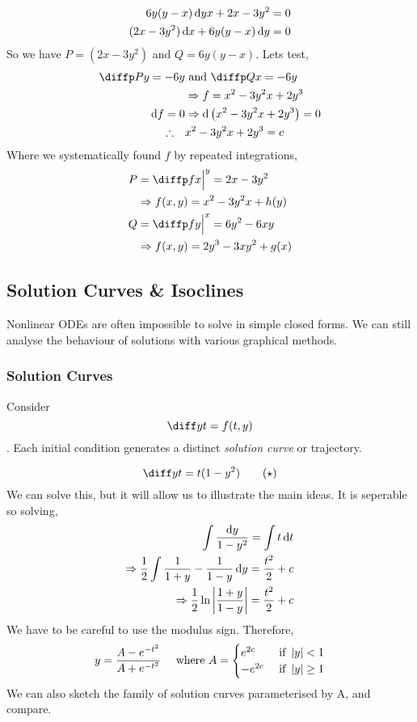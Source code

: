 \documentclass{article}
\begin{document}
\begin{eg}
    \begin{align*}
        6y(y - x) \mathop{}\!\mathrm{d} yx + 2x - 3y^2 = 0 \\
        (2x - 3y^2) \mathop{}\!\mathrm{d} x + 6y(y-x) \mathop{}\!\mathrm{d} y = 0
    \end{align*}
    So we have $P = (2x - 3y^2)$ and $Q = 6y(y-x)$. Lets test,
    \begin{align*}
        \diffp Py = -6y &\text{ and } \diffp Qx = -6y \\
        &\Rightarrow f = x^2 - 3y^2x + 2y^3 \\
        \diffd f = 0 &\Rightarrow \diffd \bkt{x^2 - 3y^2x + 2y^3} = 0 \\
        \therefore \quad & x^2 - 3y^2x + 2y^3 = c
    \end{align*}
    Where we systematically found $f$ by repeated integrations,
    \begin{align*}
        P &= \diffp fx \eval{}{y} = 2x - 3y^2 \\
        &\Rightarrow f(x, y) = x^2 - 3y^2x + h(y) \\
        Q &= \diffp fy \eval{}{x} = 6y^2 - 6xy \\
        &\Rightarrow f(x, y) = 2y^3 - 3xy^2 + g(x)
    \end{align*}
\end{eg}

\subsection{Solution Curves \& Isoclines}
Nonlinear ODEs are often impossible to solve in simple closed forms. 
We can still analyse the behaviour of solutions with various graphical methods. 

\subsubsection{Solution Curves}
Consider 
\[
    \diff yt = f(t, y)
\]. 
Each initial condition generates a distinct \emph{solution curve} or trajectory.
\begin{eg}
    \[
        \diff yt = t(1 - y^2) \tag{$\star$}
    \]
    We can solve this, but it will allow us to illustrate the main ideas.
    It is seperable so solving,
    \begin{align*}
        \int{\frac{\mathop{}\!\mathrm{d}y}{1 - y^2}} = \int{t \mathop{}\!\mathrm{d}t} \\
        \Rightarrow \frac{1}{2} \int{\frac{1}{1+y} - \frac{1}{1-y} \mathop{}\!\mathrm{d}y} = \frac{t^2}{2} + c \\
        \Rightarrow \frac{1}{2} \ln \left\lvert \frac{1 + y}{1 - y}\right\rvert = \frac{t^2}{2} + c
    \end{align*}
    We have to be careful to use the modulus sign.
    Therefore,
    \[
        y = \frac{A - e^{-t^2}}{A + e^{-t^2}} \quad \text{ where } A = \begin{cases}
            e^{2c} & \text{ if } \left\lvert y\right\rvert < 1 \\
            -e^{2c} & \text{ if } \left\lvert y\right\rvert \geq 1
        \end{cases}
    \]
    We can also sketch the family of solution curves parameterised by A, and compare.
\end{eg}
\end{document}
